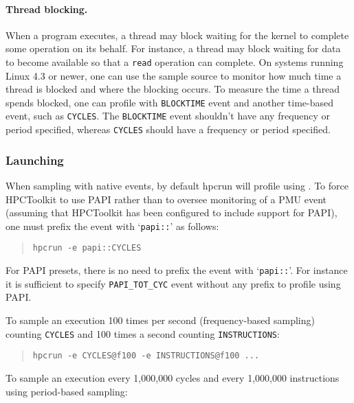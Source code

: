 \paragraph{Thread blocking.} When a program executes, 
a thread may block waiting for the kernel to complete some operation on its behalf.
For instance, a thread may block waiting for data to become available so that a {\tt read} operation 
can complete. On systems running Linux 4.3 or newer, one can use the \perfevents{} sample source to monitor how much time a thread is blocked and where the blocking occurs. To measure
the time a thread spends blocked, one can profile with \verb|BLOCKTIME| event and
another time-based event, such as \verb|CYCLES|. The \verb|BLOCKTIME| event shouldn't have any frequency or period specified, whereas \verb|CYCLES| should have a frequency or period specified.

\subsubsection{Launching}
\label{sec:perf-launching}

When sampling with native events, by default hpcrun will profile using \perfevents{}. 
To force HPCToolkit to use PAPI rather than \perfevents{} to oversee monitoring of a PMU event 
(assuming that HPCToolkit has been configured to include support for PAPI),
one must prefix the event with \lq{\verb|papi::|}\rq{} as follows:

\begin{quote}
\begin{verbatim}
hpcrun -e papi::CYCLES
\end{verbatim}
\end{quote}

For PAPI presets, there is no need to prefix the event with
 \lq{\verb|papi::|}\rq. For instance it is sufficient to specify \verb|PAPI_TOT_CYC| event
without any prefix to profile using PAPI.

To sample an execution 100 times per second (frequency-based sampling) counting \verb|CYCLES| 
and 100 times a second counting \verb|INSTRUCTIONS|:

\begin{quote}
\begin{verbatim}
hpcrun -e CYCLES@f100 -e INSTRUCTIONS@f100 ...
\end{verbatim}
\end{quote}

To sample an execution every 1,000,000 cycles and every 1,000,000 instructions using period-based sampling:

